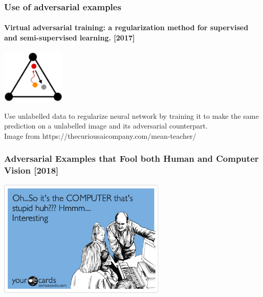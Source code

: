 \documentclass[9pt]{beamer}
\begin{document}
\begin{frame}

  \frametitle{Use of adversarial examples}

  \framesubtitle{Virtual adversarial training: a regularization method
    for supervised and semi-supervised learning. [2017]}

  \vspace{1cm}

  \begin{center}
    \includegraphics[width = 3cm]{images/vat.png}
  \end{center}

  \bigskip

  Use unlabelled data to regularize neural network by training it to
  make the same prediction on a unlabelled image and its adversarial
  counterpart.\\[1.5cm]

  {\footnotesize Image from https://thecuriousaicompany.com/mean-teacher/}
\end{frame}

\begin{frame}
  \frametitle{Adversarial Examples that Fool both Human and Computer
    Vision [2018]}

  \begin{center}
    \includegraphics[width = 8cm]{images/stupid_computer.png}
  \end{center}

\end{frame}
\end{document}
